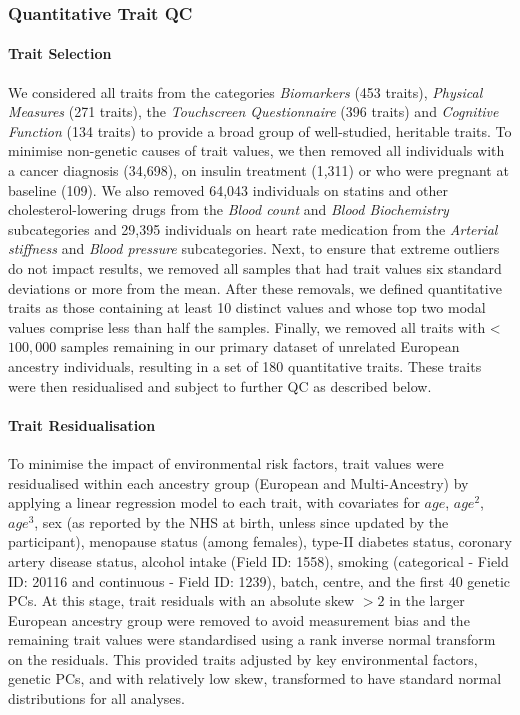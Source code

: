 \documentclass[12pt]{zHenriquesLab-StyleBioRxiv}
\begin{document}
{{\subsubsection*{Quantitative Trait QC} \label{sec:methods:traitQC} 
\paragraph*{Trait Selection} 
We considered all traits from the categories \textit{Biomarkers} (453 traits), 
\textit{Physical Measures} (271 traits), the \textit{Touchscreen Questionnaire} (396 traits) 
and \textit{Cognitive Function} (134 traits) to provide a broad group of well-studied, heritable traits. 
To minimise non-genetic causes of trait values, we then removed all individuals with a cancer diagnosis (34,698), 
on insulin treatment (1,311) or who were pregnant at baseline (109). We also removed 64,043 individuals 
on statins and other cholesterol-lowering drugs from the \textit{Blood count} 
and \textit{Blood Biochemistry} subcategories and 29,395 individuals
on heart rate medication from the \textit{Arterial stiffness} and \textit{Blood pressure} subcategories.
Next, to ensure that extreme outliers do not impact results, we removed all samples that had 
trait values six standard deviations or more from the mean. After these removals, we defined quantitative traits as 
those containing at least 10 distinct values and whose top two modal values comprise less than 
half the samples. Finally, we removed all traits with < $100,000$ samples remaining in our 
primary dataset of unrelated European ancestry individuals, resulting in a set of 180 quantitative 
traits. These traits were then residualised and subject to further QC as described below. 
%
\paragraph*{Trait Residualisation}
To minimise the impact of environmental risk factors, trait values were 
residualised within each ancestry group (European and Multi-Ancestry) by applying a linear regression 
model to each trait, with covariates for $age$, $age^2$, $age^3$, sex (as reported by the NHS at birth, unless 
since updated by the participant), menopause status (among females), %
type-II diabetes status, coronary artery disease status, alcohol intake (Field ID: 1558), 
smoking (categorical - Field ID: 20116 and continuous - Field ID: 1239), 
batch, centre, and the first 40 genetic PCs.  
At this stage, trait residuals with an absolute skew $>2$ \cite{skew_book} 
in the larger European ancestry group were removed to avoid measurement bias and 
the remaining trait values were standardised using a rank inverse 
normal transform on the residuals. This provided traits adjusted by key environmental factors, genetic 
PCs, and with relatively low skew, transformed to have standard normal distributions for all analyses. 
%
}}
\end{document}

